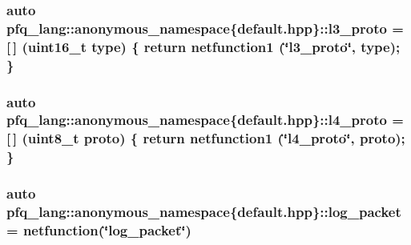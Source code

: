 \hypertarget{namespacepfq__lang_1_1anonymous__namespace_02default_8hpp_03_aed01dd5380a873d92397ec0d4c07abac}{
\subsubsection[{l3\+\_\+proto}]{\setlength{\rightskip}{0pt plus 5cm}auto pfq\+\_\+lang\+::anonymous\+\_\+namespace\{default.\+hpp\}\+::l3\+\_\+proto = \mbox{[}$\,$\mbox{]} (uint16\+\_\+t type) \{ return {\bf netfunction1} (\char`\"{}l3\+\_\+proto\char`\"{}, type); \}}}\label{namespacepfq__lang_1_1anonymous__namespace_02default_8hpp_03_aed01dd5380a873d92397ec0d4c07abac}
\hypertarget{namespacepfq__lang_1_1anonymous__namespace_02default_8hpp_03_a75da77904f1cff4cc42fc3a081f80670}{
\subsubsection[{l4\+\_\+proto}]{\setlength{\rightskip}{0pt plus 5cm}auto pfq\+\_\+lang\+::anonymous\+\_\+namespace\{default.\+hpp\}\+::l4\+\_\+proto = \mbox{[}$\,$\mbox{]} (uint8\+\_\+t proto) \{ return {\bf netfunction1} (\char`\"{}l4\+\_\+proto\char`\"{}, proto); \}}}\label{namespacepfq__lang_1_1anonymous__namespace_02default_8hpp_03_a75da77904f1cff4cc42fc3a081f80670}
\hypertarget{namespacepfq__lang_1_1anonymous__namespace_02default_8hpp_03_a82a9b0e4c53eb28a98e5c34372a5b17b}{
\subsubsection[{log\+\_\+packet}]{\setlength{\rightskip}{0pt plus 5cm}auto pfq\+\_\+lang\+::anonymous\+\_\+namespace\{default.\+hpp\}\+::log\+\_\+packet = {\bf netfunction}(\char`\"{}log\+\_\+packet\char`\"{})}}\label{namespacepfq__lang_1_1anonymous__namespace_02default_8hpp_03_a82a9b0e4c53eb28a98e5c34372a5b17b}
